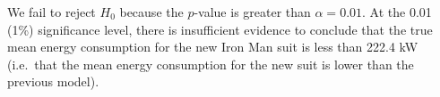 \documentclass[noanswers]{exam}
\begin{document}
\begin{questions}
\begin{parts}
\begin{solution}[\stretch{1}]
\vspace{3mm}

We fail to reject $H_0$ because the $p$-value is greater than $\alpha=0.01$. At the 0.01 (1\%) significance level, there is insufficient evidence to conclude that the true mean energy consumption for the new Iron Man suit is less than 222.4 kW (i.e.\ that the mean energy consumption for the new suit is lower than the previous model). 

\vspace{3mm}

\end{solution}
\end{parts}

\end{questions}
\end{document}

